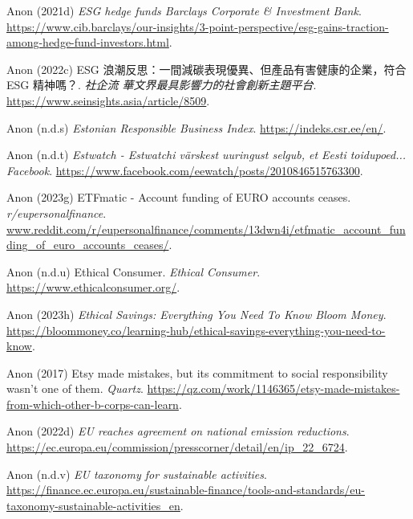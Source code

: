 \documentclass[
  letterpaper,
  DIV=11,
  numbers=noendperiod]{scrartcl}
\newlength{\cslhangindent}
\newenvironment{CSLReferences}[2] %
 {\begin{list}{}{%
  \setlength{\itemindent}{0pt}
  \setlength{\leftmargin}{0pt}
  \setlength{\parsep}{0pt}
  \ifodd #1
   \setlength{\leftmargin}{\cslhangindent}
   \setlength{\itemindent}{-1\cslhangindent}
  \fi
  \setlength{\itemsep}{#2\baselineskip}}}
 {\end{list}}
\begin{document}
\begin{CSLReferences}{0}{1}
Anon (2021d) \emph{{ESG} hedge funds {\textbar} {Barclays Corporate} \&
{Investment Bank}}.
\url{https://www.cib.barclays/our-insights/3-point-perspective/esg-gains-traction-among-hedge-fund-investors.html}.

Anon (2022c) {ESG 浪潮反思：一間減碳表現優異、但產品有害健康的企業，符合
ESG 精神嗎？}. \emph{社企流 {\textbar}
華文界最具影響力的社會創新主題平台}.
\url{https://www.seinsights.asia/article/8509}.

Anon (n.d.s) \emph{Estonian {Responsible Business Index}}.
\url{https://indeks.csr.ee/en/}.

Anon (n.d.t) \emph{Estwatch - {Estwatchi} v{ä}rskest uuringust selgub,
et {Eesti} toidupoed... {\textbar} {Facebook}}.
\url{https://www.facebook.com/eewatch/posts/2010846515763300}.

Anon (2023g) {ETFmatic} - {Account} funding of {EURO} accounts ceases.
\emph{r/eupersonalfinance}.
\href{https://www.reddit.com/r/eupersonalfinance/comments/13dwn4i/etfmatic_account_funding_of_euro_accounts_ceases/}{www.reddit.com/r/eupersonalfinance/comments/13dwn4i/etfmatic\_account\_funding\_of\_euro\_accounts\_ceases/}.

Anon (n.d.u) Ethical {Consumer}. \emph{Ethical Consumer}.
\url{https://www.ethicalconsumer.org/}.

Anon (2023h) \emph{Ethical {Savings}: {Everything You Need To Know}
{\textbar} {Bloom Money}}.
\url{https://bloommoney.co/learning-hub/ethical-savings-everything-you-need-to-know}.

Anon (2017) Etsy made mistakes, but its commitment to social
responsibility wasn't one of them. \emph{Quartz}.
\url{https://qz.com/work/1146365/etsy-made-mistakes-from-which-other-b-corps-can-learn}.

Anon (2022d) \emph{{EU} reaches agreement on national emission
reductions}.
\url{https://ec.europa.eu/commission/presscorner/detail/en/ip_22_6724}.

Anon (n.d.v) \emph{{EU} taxonomy for sustainable activities}.
\url{https://finance.ec.europa.eu/sustainable-finance/tools-and-standards/eu-taxonomy-sustainable-activities_en}.


\end{CSLReferences}
\end{document}
